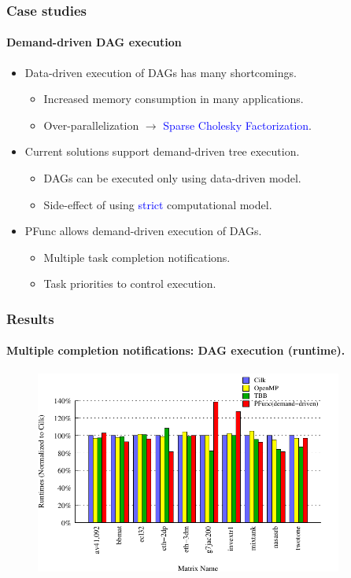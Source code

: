 \documentclass{beamer}
\begin{document}
\begin{frame}[fragile]
\frametitle{Case studies}
\framesubtitle{Demand-driven DAG execution}
\begin{itemize}
\item Data-driven execution of DAGs has many shortcomings.
  \begin{itemize}
  \item Increased memory consumption in many applications.
  \item Over-parallelization $\rightarrow{}$ \textcolor{blue}{Sparse Cholesky Factorization}.
  \end{itemize}
\item Current solutions support demand-driven tree execution.
  \begin{itemize}
  \item DAGs can be executed only using data-driven model.
  \item Side-effect of using \textcolor{blue}{strict} computational model.
  \end{itemize}
\item PFunc allows demand-driven execution of DAGs.
  \begin{itemize}
  \item Multiple task completion notifications.
  \item Task priorities to control execution.
  \end{itemize}
\end{itemize}
\end{frame}

\begin{frame}[fragile]
\frametitle{Results}
\framesubtitle{Multiple completion notifications: DAG execution (runtime).}
\begin{figure}
\includegraphics[width=0.9\textwidth]{figs/dag_speedup}
\label{fig:dag_speedup}
\end{figure}
\end{frame}
\end{document}
